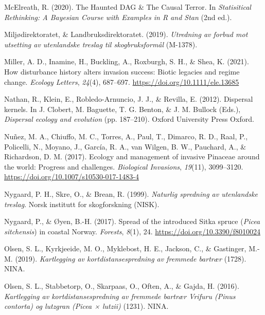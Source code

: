 \documentclass[
]{article}
\newlength{\cslhangindent}
\newenvironment{CSLReferences}[2] %
 {\begin{list}{}{%
  \setlength{\itemindent}{0pt}
  \setlength{\leftmargin}{0pt}
  \setlength{\parsep}{0pt}
  \ifodd #1
   \setlength{\leftmargin}{\cslhangindent}
   \setlength{\itemindent}{-1\cslhangindent}
  \fi
  \setlength{\itemsep}{#2\baselineskip}}}
 {\end{list}}
\begin{document}
\begin{CSLReferences}{1}{0}
McElreath, R. (2020). The {Haunted DAG} \& {The Causal Terror}. In \emph{Statisitical {Rethinking}: {A Bayesian Course} with {Examples} in {R} and {Stan}} (2nd ed.).

Miljødirektoratet, \& Landbruksdirektoratet. (2019). \emph{Utredning av forbud mot utsetting av utenlandske treslag til skogbruksformål} (M-1378).

Miller, A. D., Inamine, H., Buckling, A., Roxburgh, S. H., \& Shea, K. (2021). How disturbance history alters invasion success: Biotic legacies and regime change. \emph{Ecology Letters}, \emph{24}(4), 687--697. \url{https://doi.org/10.1111/ele.13685}

Nathan, R., Klein, E., Robledo-Arnuncio, J. J., \& Revilla, E. (2012). Dispersal kernels. In J. Clobert, M. Baguette, T. G. Benton, \& J. M. Bullock (Eds.), \emph{Dispersal ecology and evolution} (pp. 187--210). {Oxford University Press Oxford}.

Nuñez, M. A., Chiuffo, M. C., Torres, A., Paul, T., Dimarco, R. D., Raal, P., Policelli, N., Moyano, J., García, R. A., van Wilgen, B. W., Pauchard, A., \& Richardson, D. M. (2017). Ecology and management of invasive {Pinaceae} around the world: Progress and challenges. \emph{Biological Invasions}, \emph{19}(11), 3099--3120. \url{https://doi.org/10.1007/s10530-017-1483-4}

Nygaard, P. H., Skre, O., \& Brean, R. (1999). \emph{Naturlig spredning av utenlandske treslag}. {Norsk institutt for skogforskning (NISK)}.

Nygaard, P., \& Øyen, B.-H. (2017). Spread of the introduced {Sitka} spruce ({\emph{Picea sitchensis}}) in coastal {Norway}. \emph{Forests}, \emph{8}(1), 24. \url{https://doi.org/10.3390/f8010024}

Olsen, S. L., Kyrkjeeide, M. O., Myklebost, H. E., Jackson, C., \& Gastinger, M.-M. (2019). \emph{Kartlegging av kortdistansespredning av fremmede bartrær} (1728). {NINA}.

Olsen, S. L., Stabbetorp, O., Skarpaas, O., Often, A., \& Gajda, H. (2016). \emph{Kartlegging av kortdistansespredning av fremmede bartrær {Vrifuru} ({Pinus} contorta) og lutzgran ({Picea} × lutzii)} (1231). {NINA}.


\end{CSLReferences}
\end{document}
